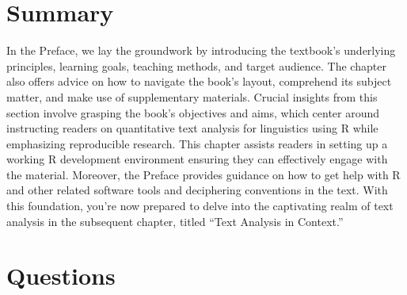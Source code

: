 \documentclass[
  letterpaper,
]{latex/krantz}
\begin{document}
\hypertarget{summary}{%
\section*{Summary}\label{summary}}


In the Preface, we lay the groundwork by introducing the textbook's
underlying principles, learning goals, teaching methods, and target
audience. The chapter also offers advice on how to navigate the book's
layout, comprehend its subject matter, and make use of supplementary
materials. Crucial insights from this section involve grasping the
book's objectives and aims, which center around instructing readers on
quantitative text analysis for linguistics using R while emphasizing
reproducible research. This chapter assists readers in setting up a
working R development environment ensuring they can effectively engage
with the material. Moreover, the Preface provides guidance on how to get
help with R and other related software tools and deciphering conventions
in the text. With this foundation, you're now prepared to delve into the
captivating realm of text analysis in the subsequent chapter, titled
``Text Analysis in Context.''

\hypertarget{questions}{%
\section*{Questions}\label{questions}}

\end{document}
